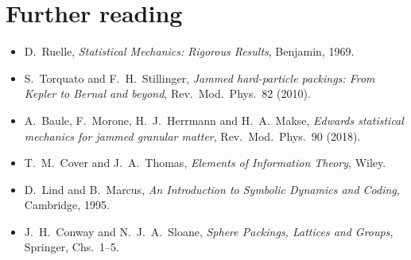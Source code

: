 \section*{Further reading}
\begin{itemize}[nosep]
\item D.~Ruelle, \emph{Statistical Mechanics: Rigorous Results}, Benjamin, 1969.
\item S.~Torquato and F.~H.~Stillinger, \emph{Jammed hard-particle packings: From Kepler to Bernal and
  beyond}, Rev.\ Mod.\ Phys.\ 82 (2010).
\item A.~Baule, F.~Morone, H.~J.~Herrmann and H.~A.~Makse, \emph{Edwards statistical mechanics for jammed
  granular matter}, Rev.\ Mod.\ Phys.\ 90 (2018).
\item T.~M.~Cover and J.~A.~Thomas, \emph{Elements of Information Theory}, Wiley.
\item D.~Lind and B.~Marcus, \emph{An Introduction to Symbolic Dynamics and Coding}, Cambridge, 1995.
\item J.~H.~Conway and N.~J.~A.~Sloane, \emph{Sphere Packings, Lattices and Groups}, Springer, Chs.~1--5.
\end{itemize}
